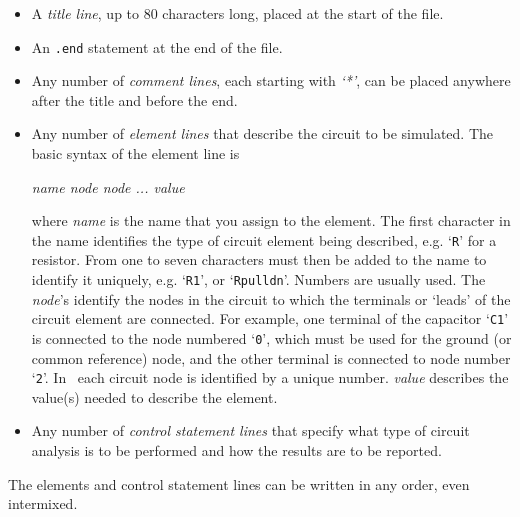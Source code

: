 \begin{itemize}
  \item A {\em title line}, up to 80 characters long, placed
	at the start of the file.
  \item An {\tt .end} statement at the end of the file.
  \item Any number of {\em comment lines}, each starting with {\em `*'}, can
	be placed anywhere after the title and before the end.
  \item Any number of {\em element lines} that describe the circuit
	to be simulated.  The basic syntax of the element line is
\begin{center}
{\it name node node ... value}
\end{center}
where  {\it name} is the name that you assign to the element.  The first
character in the name identifies the type of circuit element being
described, e.g.
`{\tt R}' for a resistor.  From one to seven characters must then be added to
the name to identify it uniquely, e.g. `{\tt R1}', or `{\tt Rpulldn}'.  Numbers are
usually used.  The  {\it node}'s identify the nodes in the circuit
to which the
terminals or `leads' of the circuit element are connected.   For example,
one terminal of the capacitor `{\tt C1}' is connected to the node numbered
`{\tt 0}',
which must be used for the ground (or common reference) node, and the
other terminal is
connected to node number `{\tt 2}'.  In \spice\ each circuit node is identified
by a unique number.  {\it value} describes the value(s) needed to
describe the element.

  \item Any number of {\em control statement lines} that specify 
	what type of circuit analysis is to be performed and how the
	results are to be reported.
\end{itemize}
The elements and control statement lines can be written in any order,
even intermixed.

